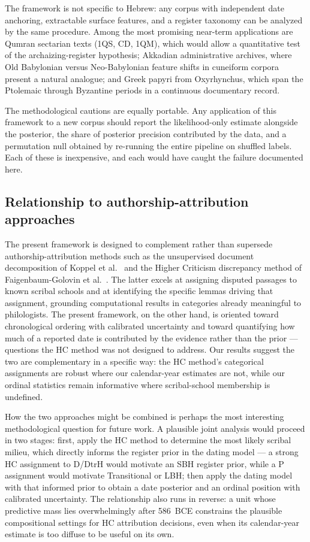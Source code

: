\documentclass[10pt,letterpaper]{article}
\begin{document}
The framework is not specific to Hebrew: any corpus with independent date
anchoring, extractable surface features, and a register taxonomy can be
analyzed by the same procedure.  Among the most promising near-term
applications are Qumran sectarian texts (1QS, CD, 1QM), which would allow
a quantitative test of the archaizing-register hypothesis; Akkadian
administrative archives, where Old Babylonian versus Neo-Babylonian feature
shifts in cuneiform corpora present a natural analogue; and Greek papyri
from Oxyrhynchus, which span the Ptolemaic through Byzantine periods in a
continuous documentary record.

The methodological cautions are equally portable.  Any application of
this framework to a new corpus should report the likelihood-only estimate
alongside the posterior, the share of posterior precision contributed by
the data, and a permutation null obtained by re-running the entire
pipeline on shuffled labels.  Each of these is inexpensive, and each
would have caught the failure documented here.

\subsection*{Relationship to authorship-attribution approaches}

The present framework is designed to complement rather than supersede
authorship-attribution methods such as the unsupervised document
decomposition of Koppel et al.~\cite{Koppel2011} and the Higher Criticism
discrepancy method of Faigenbaum-Golovin et al.~\cite{Faigenbaum2025}.
The latter excels at assigning disputed passages to known scribal schools
and at identifying the specific lemmas driving that assignment, grounding
computational results in categories already meaningful to philologists.
The present framework, on the other hand, is oriented toward
chronological ordering with calibrated uncertainty and toward quantifying
how much of a reported date is contributed by the evidence rather than the
prior --- questions the HC method was not designed to address.  Our
results suggest the two are complementary in a specific way: the HC
method's categorical assignments are robust where our calendar-year
estimates are not, while our ordinal statistics remain informative where
scribal-school membership is undefined.

How the two approaches might be combined is perhaps the most interesting
methodological question for future work.  A plausible joint analysis would
proceed in two stages: first, apply the HC method to determine the most
likely scribal milieu, which directly informs the register prior in
the dating model --- a strong HC assignment to D/DtrH would motivate an SBH
register prior, while a P assignment would motivate Transitional or LBH;
then apply the dating model with that informed prior to obtain a date posterior and
an ordinal position with calibrated uncertainty.  The relationship also
runs in reverse: a unit whose predictive mass lies overwhelmingly after
586~BCE constrains the plausible compositional settings for HC attribution
decisions, even when its calendar-year estimate is too diffuse to be
useful on its own.
\end{document}
